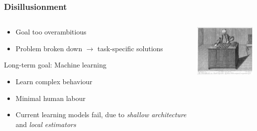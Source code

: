 \begin{frame}
	\frametitle{Disillusionment}
	\begin{columns}
		\begin{column}{7.5cm}
			\begin{itemize}
				\item Goal too overambitious
				\item Problem broken down $\rightarrow$ task-specific solutions
			\end{itemize}
			
			\begin{block}{Long-term goal: Machine learning}
				\begin{itemize}
					\item Learn complex behaviour
					\item Minimal human labour
				\end{itemize}
			\end{block}
			
			\begin{itemize}
				\item Current learning models fail, due to \emph{shallow architecture} and \emph{local estimators}
			\end{itemize}
			
		\end{column}
		\begin{column}{4cm}
			\includegraphics[width=4cm]{images/mechanical-turk.jpg}
		\end{column}
	\end{columns}
\end{frame}

